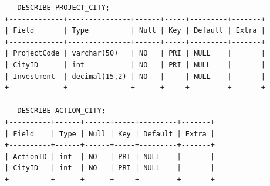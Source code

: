 \documentclass[11pt,a4paper]{article}
\begin{document}
\begin{Verbatim}
-- DESCRIBE PROJECT_CITY;
+-------------+---------------+------+-----+---------+-------+
| Field       | Type          | Null | Key | Default | Extra |
+-------------+---------------+------+-----+---------+-------+
| ProjectCode | varchar(50)   | NO   | PRI | NULL    |       |
| CityID      | int           | NO   | PRI | NULL    |       |
| Investment  | decimal(15,2) | NO   |     | NULL    |       |
+-------------+---------------+------+-----+---------+-------+

-- DESCRIBE ACTION_CITY;
+----------+------+------+-----+---------+-------+
| Field    | Type | Null | Key | Default | Extra |
+----------+------+------+-----+---------+-------+
| ActionID | int  | NO   | PRI | NULL    |       |
| CityID   | int  | NO   | PRI | NULL    |       |
+----------+------+------+-----+---------+-------+
\end{Verbatim}
\end{document}
